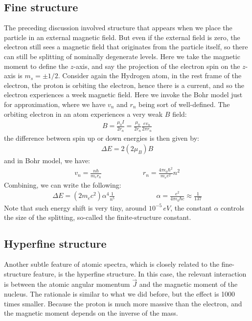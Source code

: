 \documentclass[11pt]{article}
\theoremstyle{break}
\theoremstyle{break}
\begin{document}
\subsection{Fine structure}
The preceding discussion involved structure that appears when we place the particle in an external magnetic field. But even if the external field is zero, the electron still sees a magnetic field that originates from the particle itself, so there can still be splitting of nominally degenerate levels. Here we take the magnetic moment to define the $z$-axis, and say the projection of the electron spin on the $z$-axis is $m_s= \pm 1/2$. Consider again the Hydrogen atom, in the rest frame of the electron, the proton is orbiting the electron, hence there is a current, and so the electron experiences a week magnetic field. Here we invoke the Bohr model just for approximation, where we have $v_n$ and $r_n$ being sort of well-defined. The orbiting electron in an atom experiences a very weak $B$ field:
\begin{align*}
B = \frac{\mu_0 I}{2r_n} = \frac{\mu_0}{2r_n}\frac{ev_n}{2\pi r_n}
\end{align*}
the difference between spin up or down energies is then given by:
\begin{align*}
\Delta E = 2(2\mu_B)B
\end{align*}
and in Bohr model, we have:
\begin{align*}
v_n = \frac{n\hbar}{m_e r_n} \qquad\qquad\qquad r_n = \frac{4\pi \epsilon_0 \hbar^2}{m_e e^2}n^2
\end{align*}
Combining, we can write the following:
\begin{align*}
\Delta E = (2m_e c^2)\alpha^4 \frac{1}{n^5} \qquad\qquad\qquad \alpha = \frac{e^2}{4\pi \epsilon_0 \hbar c} \approx \frac{1}{137}
\end{align*}
Note that such energy shift is very tiny, around $10^{-5}\, eV$, the constant $\alpha$  controls the size of the splitting, so-called the finite-structure constant. \\

\subsection{Hyperfine structure}
Another subtle feature of atomic spectra, which is closely related to the fine-structure feature, is the hyperfine structure. In this case, the relevant interaction is between the atomic angular momentum $\vec{J}$ and the magnetic moment of the nucleus. The rationale is similar to what we did before, but the effect is 1000 times smaller. Because the proton is much more massive than the electron, and the magnetic moment depends on the inverse of the mass.\\
\end{document}
